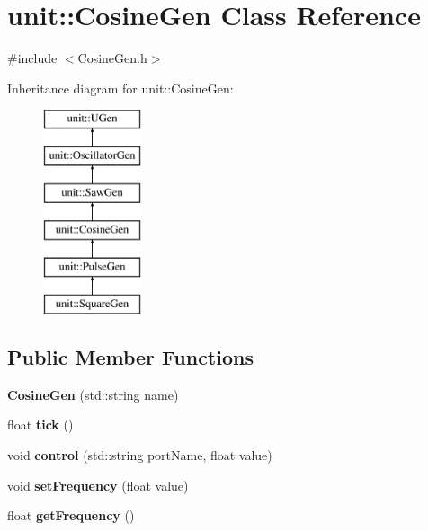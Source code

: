 \hypertarget{classunit_1_1CosineGen}{}\section{unit\+:\+:Cosine\+Gen Class Reference}
\label{classunit_1_1CosineGen}


{\ttfamily \#include $<$Cosine\+Gen.\+h$>$}

Inheritance diagram for unit\+:\+:Cosine\+Gen\+:\begin{figure}[H]
\begin{center}
\leavevmode
\includegraphics[height=6.000000cm]{classunit_1_1CosineGen}
\end{center}
\end{figure}
\subsection*{Public Member Functions}
\begin{DoxyCompactItemize}
\item 
{\bfseries Cosine\+Gen} (std\+::string name)\hypertarget{classunit_1_1CosineGen_a1eb4aa0471f337e95653d91e550f58cb}{}\label{classunit_1_1CosineGen_a1eb4aa0471f337e95653d91e550f58cb}

\item 
float {\bfseries tick} ()\hypertarget{classunit_1_1CosineGen_a4c1ceffaf70b5eae5c4153ee4b93c001}{}\label{classunit_1_1CosineGen_a4c1ceffaf70b5eae5c4153ee4b93c001}

\item 
void {\bfseries control} (std\+::string port\+Name, float value)\hypertarget{classunit_1_1CosineGen_a15411f97b09516de2bf85327615f1784}{}\label{classunit_1_1CosineGen_a15411f97b09516de2bf85327615f1784}

\item 
void {\bfseries set\+Frequency} (float value)\hypertarget{classunit_1_1CosineGen_aebdf5bbd7a0614f3a3cd2ae0d8602b32}{}\label{classunit_1_1CosineGen_aebdf5bbd7a0614f3a3cd2ae0d8602b32}

\item 
float {\bfseries get\+Frequency} ()\hypertarget{classunit_1_1CosineGen_a2865a158e86e8e85ac2c4d686de65fce}{}\label{classunit_1_1CosineGen_a2865a158e86e8e85ac2c4d686de65fce}

\end{DoxyCompactItemize}
